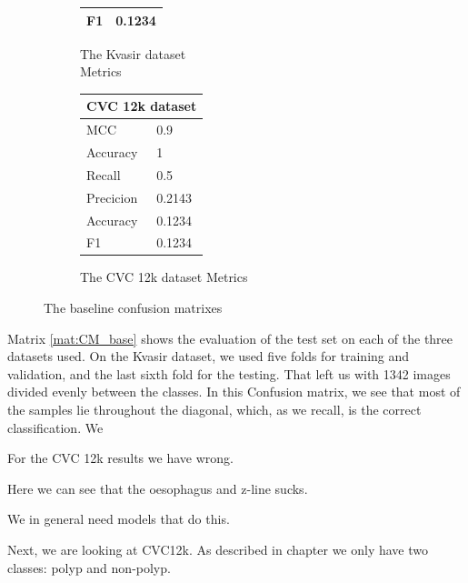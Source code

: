 \begin{figure}[h]
\begin{subfigure}[b]{0.49\textwidth}
\begin{tabular}{ll}
        F1                                     & 0.1234\\
        \bottomrule
\end{tabular}
\caption{The Kvasir dataset\\ Metrics}
\label{tab:kvasir_metrics_base}
\end{subfigure}%
\begin{subfigure}[b]{0.25\textwidth}
        \begin{tabular}{ll}
        \toprule
        \multicolumn{2}{c}{CVC 12k dataset}        \\
        \midrule
        MCC & 0.9    \\
        Accuracy                         & 1      \\
        Recall                              & 0.5    \\
        Precicion                        & 0.2143 \\
        Accuracy                        & 0.1234 \\
        F1                                     & 0.1234\\
        \bottomrule
        \end{tabular}
\caption{The CVC 12k dataset Metrics}
\label{tab:cvc12k_metrics_base}
\end{subfigure}
\caption{The baseline confusion matrixes}
\label{fig:BaselineCM}
\end{figure}

\FloatBarrier
\noindent
Matrix \ref{mat:CM_base} shows the evaluation of the test set on each of the three datasets used. 
On the Kvasir dataset, we used five folds for training and validation, and the last sixth fold for the testing. That left us with 1342 images divided evenly between the classes. 
In this Confusion matrix, we see that most of the samples lie throughout the diagonal, which, as we recall, is the correct classification.
We 

For the CVC 12k results we have wrong. 






Here we can see that the oesophagus and z-line sucks. 

We in general need models that do this. 

Next, we are looking at CVC12k. As described in chapter  we only have two classes: polyp and non-polyp.





